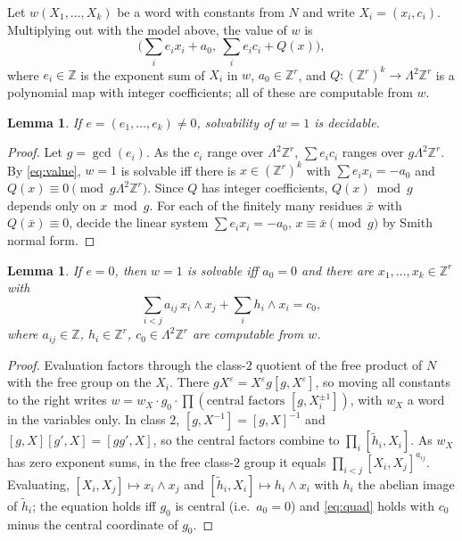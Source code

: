 \documentclass[11pt]{amsart}
\newtheorem{lemma}[theorem]{Lemma}
\theoremstyle{definition}
\theoremstyle{remark}
\newcommand{\Z}{\mathbb{Z}}
\newcommand{\w}{\wedge}
\begin{document}
Let $w(X_1,\dots,X_k)$ be a word with constants from $N$ and write
$X_i=(x_i,c_i)$. Multiplying out with the model above, the value of $w$ is
\begin{equation}\label{eq:value}
\Big(\textstyle\sum_i e_ix_i+a_0,\ \sum_i e_ic_i+Q(x)\Big),
\end{equation}
where $e_i\in\Z$ is the exponent sum of $X_i$ in $w$, $a_0\in\Z^r$, and
$Q\colon(\Z^r)^k\to\Lambda^2\Z^r$ is a polynomial map with integer coefficients;
all of these are computable from $w$.

\begin{lemma}\label{lem:nonzero}
If $e=(e_1,\dots,e_k)\ne0$, solvability of $w=1$ is decidable.
\end{lemma}

\begin{proof}
Let $g=\gcd(e_i)$. As the $c_i$ range over $\Lambda^2\Z^r$, $\sum e_ic_i$ ranges over
$g\Lambda^2\Z^r$. By \eqref{eq:value}, $w=1$ is solvable iff there is
$x\in(\Z^r)^k$ with $\sum e_ix_i=-a_0$ and $Q(x)\equiv0\pmod{g\Lambda^2\Z^r}$.
Since $Q$ has integer coefficients, $Q(x)\bmod g$ depends only on $x\bmod g$. For
each of the finitely many residues $\bar x$ with $Q(\bar x)\equiv0$, decide the
linear system $\sum e_ix_i=-a_0$, $x\equiv\bar x\pmod g$ by Smith normal form.
\end{proof}

\begin{lemma}\label{lem:zero}
If $e=0$, then $w=1$ is solvable iff $a_0=0$ and there are $x_1,\dots,x_k\in\Z^r$ with
\begin{equation}\label{eq:quad}
\sum_{i<j}a_{ij}\,x_i\w x_j+\sum_i h_i\w x_i=c_0,
\end{equation}
where $a_{ij}\in\Z$, $h_i\in\Z^r$, $c_0\in\Lambda^2\Z^r$ are computable from $w$.
\end{lemma}

\begin{proof}
Evaluation factors through the class-$2$ quotient of the free product of $N$ with
the free group on the $X_i$. There $gX^{\varepsilon}=X^{\varepsilon}g[g,X^{\varepsilon}]$,
so moving all constants to the right writes $w=w_X\cdot g_0\cdot\prod(\text{central
factors }[g,X_i^{\pm1}])$, with $w_X$ a word in the variables only. In class $2$,
$[g,X^{-1}]=[g,X]^{-1}$ and $[g,X][g',X]=[gg',X]$, so the central factors combine to
$\prod_i[\tilde h_i,X_i]$. As $w_X$ has zero exponent sums, in the free class-$2$
group it equals $\prod_{i<j}[X_i,X_j]^{a_{ij}}$. Evaluating, $[X_i,X_j]\mapsto x_i\w
x_j$ and $[\tilde h_i,X_i]\mapsto h_i\w x_i$ with $h_i$ the abelian image of
$\tilde h_i$; the equation holds iff $g_0$ is central (i.e.\ $a_0=0$) and
\eqref{eq:quad} holds with $c_0$ minus the central coordinate of $g_0$.
\end{proof}
\end{document}
